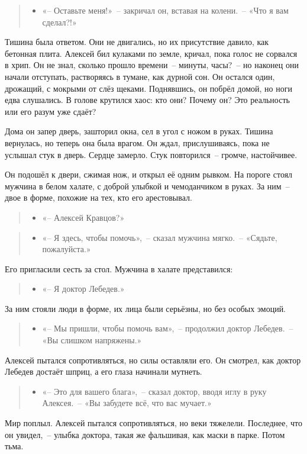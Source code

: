 \documentclass[12pt,a4paper]{book}
\newenvironment{dialogue}{\begin{quote}\itshape\begin{itemize}\item[]}{\end{itemize}\end{quote}}
\begin{document}
\begin{dialogue}
«-- Оставьте меня!»~-- закричал он, вставая на колени.~-- «Что я вам сделал?!»
\end{dialogue}

Тишина была ответом. Они не двигались, но их присутствие давило, как бетонная плита. Алексей бил кулаками по земле, кричал, пока голос не сорвался в хрип. Он не знал, сколько прошло времени~-- минуты, часы?~-- но наконец они начали отступать, растворяясь в тумане, как дурной сон.
Он остался один, дрожащий, с мокрыми от слёз щеками. Поднявшись, он побрёл домой, но ноги едва слушались. В голове крутился хаос: кто они? Почему он? Это реальность или его разум уже сдаёт?

Дома он запер дверь, зашторил окна, сел в угол с ножом в руках. Тишина вернулась, но теперь она была врагом. Он ждал, прислушиваясь, пока не услышал стук в дверь. Сердце замерло. Стук повторился~-- громче, настойчивее.

Он подошёл к двери, сжимая нож, и открыл её одним рывком. На пороге стоял мужчина в белом халате, с доброй улыбкой и чемоданчиком в руках. За ним~-- двое в форме, похожие на тех, кто его арестовывал.

\begin{dialogue}
«-- Алексей Кравцов?»
\end{dialogue}

\begin{dialogue}
«-- Я здесь, чтобы помочь»,~-- сказал мужчина мягко.~-- «Сядьте, пожалуйста.»
\end{dialogue}

Его пригласили сесть за стол. Мужчина в халате представился:

\begin{dialogue}
«-- Я доктор Лебедев.»
\end{dialogue}

За ним стояли люди в форме, их лица были серьёзны, но без особых эмоций.

\begin{dialogue}
«-- Мы пришли, чтобы помочь вам»,~-- продолжил доктор Лебедев.~-- «Вы слишком напряжены.»
\end{dialogue}

Алексей пытался сопротивляться, но силы оставляли его. Он смотрел, как доктор Лебедев достаёт шприц, а его глаза начинали мутнеть.

\begin{dialogue}
«-- Это для вашего блага»,~-- сказал доктор, вводя иглу в руку Алексея.~-- «Вы забудете всё, что вас мучает.»
\end{dialogue}

Мир поплыл. Алексей пытался сопротивляться, но веки тяжелели. Последнее, что он увидел,~-- улыбка доктора, такая же фальшивая, как маски в парке. Потом тьма.
\end{document}

